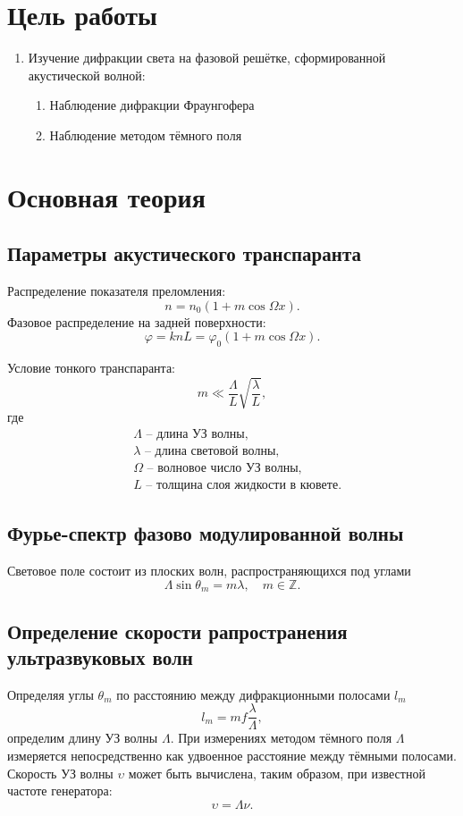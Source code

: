 \documentclass{../tools/letask}
\begin{document}


\section{Цель работы}
\begin{enumerate}
\item
Изучение дифракции света на \textsf{фазовой решётке}, сформированной акустической волной:
\begin{enumerate}
\item Наблюдение дифракции Фраунгофера
\item Наблюдение методом тёмного поля
\end{enumerate}

\end{enumerate}
\section{Основная теория}
\subsection{Параметры акустического транспаранта}
Распределение показателя преломления:
$$n=n_0(1+m\cos \Omega x).$$
Фазовое распределение на задней поверхности:
$$\varphi = knL = \varphi_0(1+m\cos \Omega x).$$

Условие тонкого транспаранта:
$$m \ll \dfrac{\Lambda}{L} \sqrt{\dfrac{\lambda}{L}},$$
где 
\begin{align*}
&\Lambda \text{ -- длина УЗ волны,}\\
&\lambda \text{ -- длина световой волны,}\\
&\Omega \text{ -- волновое число УЗ волны,}\\
&L \text{ -- толщина слоя жидкости в кювете.}
\end{align*}

\subsection{Фурье-спектр фазово модулированной волны}
Световое поле состоит из плоских волн, распространяющихся под углами 
$$\Lambda \sin \theta_m = m \lambda, \quad m \in \mathbb{Z}.$$

\subsection{Определение скорости рапространения ультразвуковых волн}
Определяя углы $\theta_m$ по расстоянию между дифракционными полосами $l_m$
$$l_m = mf\dfrac{\lambda}{\Lambda},$$
определим длину УЗ волны $\Lambda$.
При измерениях методом тёмного поля $\Lambda$ измеряется непосредственно как удвоенное расстояние между тёмными полосами.
Скорость УЗ волны $\upsilon$ может быть вычислена, таким образом, при известной частоте генератора:
$$\upsilon= \Lambda \nu.$$
\end{document}
